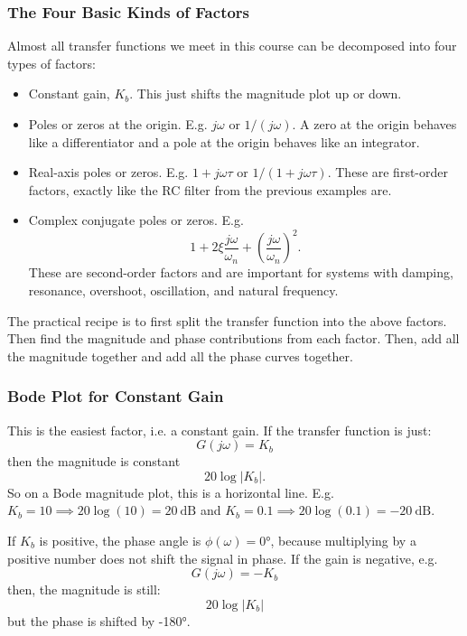 \subsubsection{The Four Basic Kinds of Factors}
Almost all transfer functions we meet in this course can be decomposed into four types of factors:
\begin{itemize}
  \item Constant gain, $K_b$.
    This just shifts the magnitude plot up or down.
  \item Poles or zeros at the origin.
    E.g. $j\omega$ or $1 / (j\omega)$.
    A zero at the origin behaves like a differentiator and a pole at the origin behaves like an integrator.
  \item Real-axis poles or zeros.
    E.g. $1 + j \omega\tau$ or $1 / (1 + j \omega \tau)$.
    These are first-order factors, exactly like the RC filter from the previous examples are.
  \item Complex conjugate poles or zeros.
    E.g.
    \begin{equation*}
      1 + 2 \xi \frac{j\omega}{\omega_n} + \left( \frac{j \omega}{\omega_n} \right)^2
    .\end{equation*}
    These are second-order factors and are important for systems with damping, resonance, overshoot, oscillation, and natural frequency.
\end{itemize}
The practical recipe is to first split the transfer function into the above factors.
Then find the magnitude and phase contributions from each factor.
Then, add all the magnitude together and add all the phase curves together.

\subsubsection{Bode Plot for Constant Gain}
This is the easiest factor, i.e. a constant gain.
If the transfer function is just:
\begin{equation*}
  G(j\omega) = K_b
\end{equation*}
then the magnitude is constant
\begin{equation*}
  20 \log \left| K_b \right|
.\end{equation*}
So on a Bode magnitude plot, this is a horizontal line.
E.g. $K_b = 10 \implies 20 \log (10) = \qty{20}{\dB}$ and $K_b = \num{0,1} \implies 20 \log (\num{0,1} ) = - \qty{20}{\dB}$.

If $K_b$ is positive, the phase angle is $\phi(\omega) = \ang{0}$, because multiplying by a positive number does not shift the signal in phase.
If the gain is negative, e.g.
\begin{equation*}
  G(j\omega) = - K_b
\end{equation*}
then, the magnitude is still:
\begin{equation*}
  20 \log \left| K_b \right|
\end{equation*}
but the phase is shifted by \ang{-180}.

